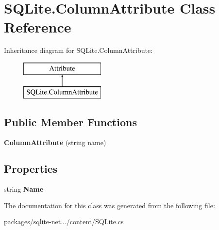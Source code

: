 \hypertarget{classSQLite_1_1ColumnAttribute}{}\section{S\+Q\+Lite.\+Column\+Attribute Class Reference}
\label{classSQLite_1_1ColumnAttribute}
Inheritance diagram for S\+Q\+Lite.\+Column\+Attribute\+:\begin{figure}[H]
\begin{center}
\leavevmode
\includegraphics[height=2.000000cm]{classSQLite_1_1ColumnAttribute}
\end{center}
\end{figure}
\subsection*{Public Member Functions}
\begin{DoxyCompactItemize}
\item 
\hypertarget{classSQLite_1_1ColumnAttribute_aa7ecb3d322d1fde710f51558b314ad6f}{}{\bfseries Column\+Attribute} (string name)\label{classSQLite_1_1ColumnAttribute_aa7ecb3d322d1fde710f51558b314ad6f}

\end{DoxyCompactItemize}
\subsection*{Properties}
\begin{DoxyCompactItemize}
\item 
\hypertarget{classSQLite_1_1ColumnAttribute_af2e6c8ab9f0b1ce7f10ea75346f9b3c8}{}string {\bfseries Name}\label{classSQLite_1_1ColumnAttribute_af2e6c8ab9f0b1ce7f10ea75346f9b3c8}

\end{DoxyCompactItemize}


The documentation for this class was generated from the following file\+:\begin{DoxyCompactItemize}
\item 
packages/sqlite-\/net.../content/S\+Q\+Lite.\+cs\end{DoxyCompactItemize}
